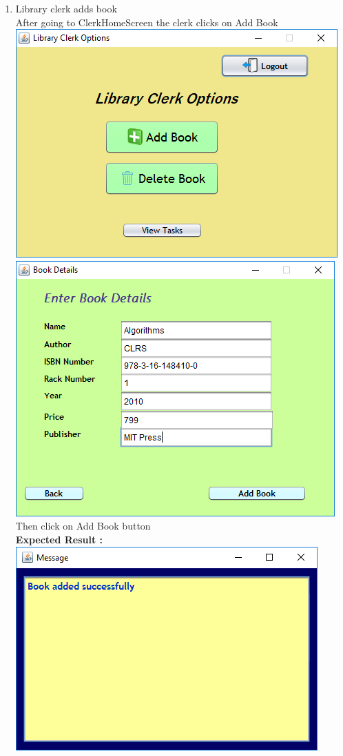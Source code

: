 \documentclass{article}
\begin{document}
\begin{enumerate}
\begin{itemize}
\end{itemize}
\item Library clerk adds book\\
After going to ClerkHomeScreen the clerk clicks on Add Book\\
\includegraphics[scale=0.8]{images/ClerkLogin/ClerkActions.PNG}\\
\includegraphics[scale=0.8]{images/ClerkLogin/Actions/AddBook/BookDetails.PNG}\\
Then click on Add Book button\\
\textbf{Expected Result :}\\
\includegraphics[scale=0.8]{images/ClerkLogin/Actions/AddBook/BookAdded.PNG}\\

\end{enumerate}
\end{document}
